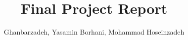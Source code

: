 %
%


\documentclass[
	12pt, %
]{packages/fphw}




\title{Final Project Report} %

\author{Ghanbarzadeh, Yasamin Borhani, Mohammad Hoseinzadeh} %

